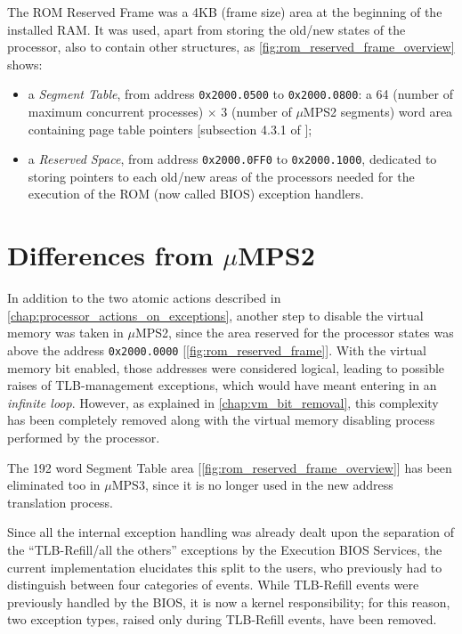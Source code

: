 \documentclass[12pt,a4paper,openright,twoside]{report}
\begin{document}
The ROM Reserved Frame was a 4KB (frame size) area at the beginning of the installed RAM.
It was used, apart from storing the old/new states of the processor, also to contain other structures, as \autoref{fig:rom_reserved_frame_overview} shows:
\begin{itemize}
	\item a \textit{Segment Table}, from address \texttt{0x2000.0500} to \texttt{0x2000.0800}: a 64 (number of maximum concurrent processes) $\times$ 3 (number of $\mu$MPS2 segments) word area containing page table pointers [subsection 4.3.1 of \cite{old_pops}];
	\item a \textit{Reserved Space}, from address \texttt{0x2000.0FF0} to \texttt{0x2000.1000}, dedicated to storing pointers to each old/new areas of the processors needed for the execution of the ROM (now called BIOS) exception handlers.
\end{itemize}

\section{Differences from $\mu$MPS2}
In addition to the two atomic actions described in \autoref{chap:processor_actions_on_exceptions}, another step to disable the virtual memory was taken in $\mu$MPS2, since the area reserved for the processor states was above the address \texttt{0x2000.0000} [\autoref{fig:rom_reserved_frame}].
With the virtual memory bit enabled, those addresses were considered logical, leading to possible raises of TLB-management exceptions, which would have meant entering in an \textit{infinite loop}.
However, as explained in \autoref{chap:vm_bit_removal}, this complexity has been completely removed along with the virtual memory disabling process performed by the processor.

The 192 word Segment Table area [\autoref{fig:rom_reserved_frame_overview}] has been eliminated too in $\mu$MPS3, since it is no longer used in the new address translation process.

Since all the internal exception handling was already dealt upon the separation of the ``TLB-Refill/all the others'' exceptions by the Execution BIOS Services, the current implementation elucidates this split to the users, who previously had to distinguish between four categories of events.
While TLB-Refill events were previously handled by the BIOS, it is now a kernel responsibility; for this reason, two exception types, raised only during TLB-Refill events, have been removed.
\end{document}
